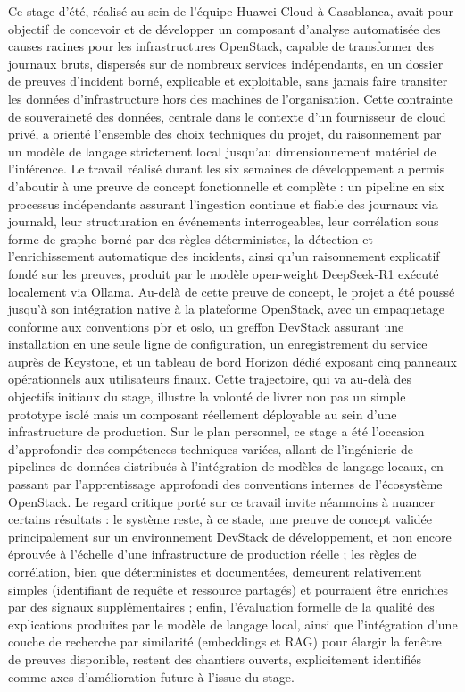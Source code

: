 \documentclass[a4paper,11pt,oneside]{report}
\begin{document}
Ce stage d'été, réalisé au sein de l'équipe Huawei Cloud à Casablanca, avait pour objectif de concevoir et de développer un composant d'analyse automatisée des causes racines pour les infrastructures OpenStack, capable de transformer des journaux bruts, dispersés sur de nombreux services indépendants, en un dossier de preuves d'incident borné, explicable et exploitable, sans jamais faire transiter les données d'infrastructure hors des machines de l'organisation. Cette contrainte de souveraineté des données, centrale dans le contexte d'un fournisseur de cloud privé, a orienté l'ensemble des choix techniques du projet, du raisonnement par un modèle de langage strictement local jusqu'au dimensionnement matériel de l'inférence. Le travail réalisé durant les six semaines de développement a permis d'aboutir à une preuve de concept fonctionnelle et complète : un pipeline en six processus indépendants assurant l'ingestion continue et fiable des journaux via journald, leur structuration en événements interrogeables, leur corrélation sous forme de graphe borné par des règles déterministes, la détection et l'enrichissement automatique des incidents, ainsi qu'un raisonnement explicatif fondé sur les preuves, produit par le modèle open-weight DeepSeek-R1 exécuté localement via Ollama. Au-delà de cette preuve de concept, le projet a été poussé jusqu'à son intégration native à la plateforme OpenStack, avec un empaquetage conforme aux conventions pbr et oslo, un greffon DevStack assurant une installation en une seule ligne de configuration, un enregistrement du service auprès de Keystone, et un tableau de bord Horizon dédié exposant cinq panneaux opérationnels aux utilisateurs finaux. Cette trajectoire, qui va au-delà des objectifs initiaux du stage, illustre la volonté de livrer non pas un simple prototype isolé mais un composant réellement déployable au sein d'une infrastructure de production. Sur le plan personnel, ce stage a été l'occasion d'approfondir des compétences techniques variées, allant de l'ingénierie de pipelines de données distribués à l'intégration de modèles de langage locaux, en passant par l'apprentissage approfondi des conventions internes de l'écosystème OpenStack. Le regard critique porté sur ce travail invite néanmoins à nuancer certains résultats : le système reste, à ce stade, une preuve de concept validée principalement sur un environnement DevStack de développement, et non encore éprouvée à l'échelle d'une infrastructure de production réelle ; les règles de corrélation, bien que déterministes et documentées, demeurent relativement simples (identifiant de requête et ressource partagés) et pourraient être enrichies par des signaux supplémentaires ; enfin, l'évaluation formelle de la qualité des explications produites par le modèle de langage local, ainsi que l'intégration d'une couche de recherche par similarité (embeddings et RAG) pour élargir la fenêtre de preuves disponible, restent des chantiers ouverts, explicitement identifiés comme axes d'amélioration future à l'issue du stage.
\end{document}
